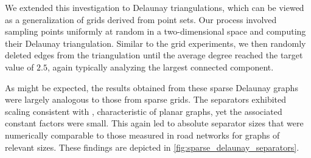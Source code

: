 We extended this investigation to Delaunay triangulations, which can be viewed as a generalization of grids derived from point sets.
Our process involved sampling points uniformly at random in a two-dimensional space and computing their Delaunay triangulation.
Similar to the grid experiments, we then randomly deleted edges from the triangulation until the average degree reached the target value of \(2.5\), again typically analyzing the largest connected component.

As might be expected, the results obtained from these sparse Delaunay graphs were largely analogous to those from sparse grids.
The separators exhibited scaling consistent with , characteristic of planar graphs, yet the associated constant factors were small.
This again led to absolute separator sizes that were numerically comparable to those measured in road networks for graphs of relevant sizes.
These findings are depicted in \cref{fig:sparse_delaunay_separators}.

